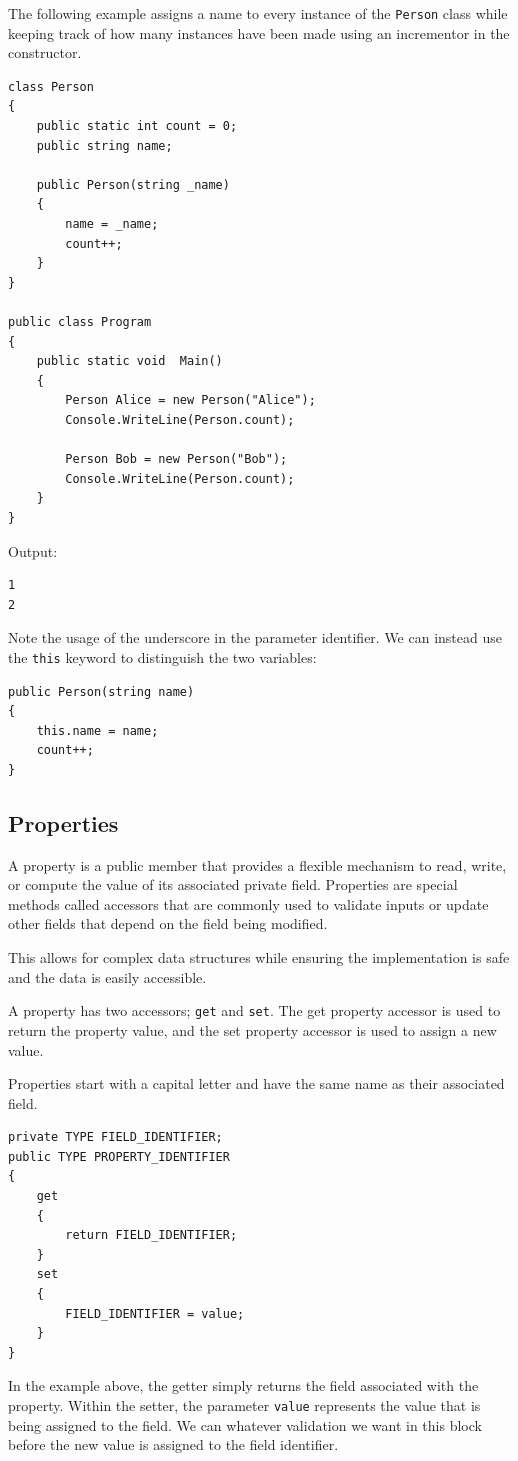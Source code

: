 \documentclass{article}
\begin{document}
The following example assigns a name to every instance of the \lstinline{Person} class while keeping track of
how many instances have been made using an incrementor in the constructor.
\begin{lstlisting}
class Person
{
    public static int count = 0;
    public string name;

    public Person(string _name)
    {
        name = _name;
        count++;
    }
}

public class Program
{
    public static void  Main()
    {
        Person Alice = new Person("Alice");
        Console.WriteLine(Person.count);

        Person Bob = new Person("Bob");
        Console.WriteLine(Person.count);
    }
}
\end{lstlisting}
Output:
\begin{lstlisting}[numbers=none]
1
2
\end{lstlisting}
Note the usage of the underscore in the parameter identifier. We can instead use
the \lstinline{this} keyword to distinguish the two variables:
\begin{lstlisting}[numbers=none]
public Person(string name)
{
    this.name = name;
    count++;
}
\end{lstlisting}
\subsection{Properties}
A property is a public member that provides a flexible mechanism to read, write,
or compute the value of its associated private field. Properties are special methods called accessors that are commonly used to validate inputs
or update other fields that depend on the field being modified.

This allows for complex data structures while ensuring the implementation is safe and
the data is easily accessible.

A property has two accessors; \lstinline{get} and \lstinline{set}. The get property accessor is used to
return the property value, and the set property accessor is used to assign a new value.

Properties start with a capital letter and have the same name as their associated field.
\begin{lstlisting}[numbers=none]
private TYPE FIELD_IDENTIFIER;
public TYPE PROPERTY_IDENTIFIER 
{
    get
    {
        return FIELD_IDENTIFIER;
    }
    set
    {
        FIELD_IDENTIFIER = value;
    }
}
\end{lstlisting}
In the example above, the getter simply returns the field associated with the property.
Within the setter, the parameter \lstinline{value} represents the value that is being
assigned to the field. We can whatever validation we want in this block before the new value is assigned to
the field identifier.
\end{document}
